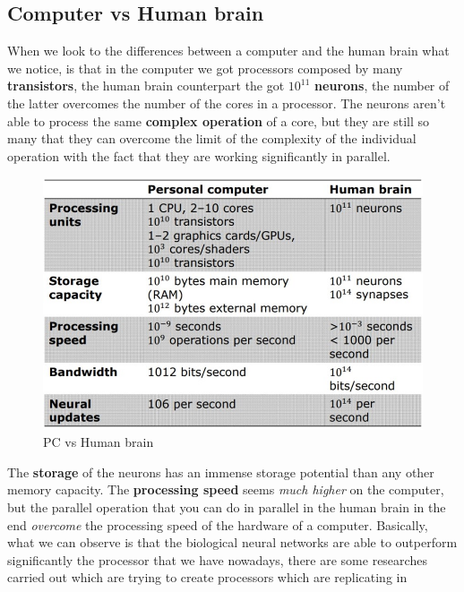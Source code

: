 \documentclass{article}
\begin{document}
\subsection{Computer vs Human brain}
When we look to the differences between a computer and the human brain what we notice,
is that in the computer we got processors composed by many \textbf{transistors}, the human brain counterpart
the got $10^{11}$ \textbf{neurons}, the number of the latter overcomes the number of the cores in a processor.
\newline\newline
The neurons aren’t able to process the same \textbf{complex operation} of a core, but they are still so many that they
can overcome the limit of the complexity of the individual operation with the fact that they are working significantly in
parallel.
\begin{figure}[H]
    \centering
    \includegraphics[scale=1.0]{images/tab_pc_vs_brain.jpg}
    \caption{PC vs Human brain}
    \label{fig:tab_pc_vs_brain}
\end{figure}
\noindent The \textbf{storage} of the neurons has an immense storage potential than any other memory capacity. The \textbf{processing speed}
seems \textit{much higher} on the computer, but the parallel operation that you can do in parallel in the human brain in
the end \textit{overcome} the processing speed of the hardware of a computer.
\newline\newline
Basically, what we can observe is that the biological neural networks are able to outperform significantly the processor that
we have nowadays, there are some researches carried out which are trying to create processors which are replicating in
\end{document}
